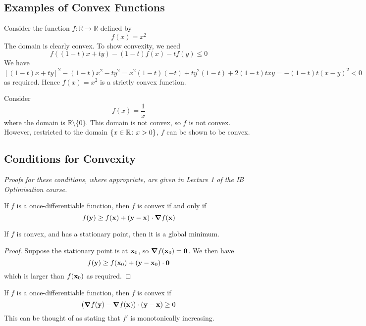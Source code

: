 \subsection{Examples of Convex Functions}
\begin{example}
    Consider the function \( f \colon \mathbb R \to \mathbb R \) defined by
\[ f(x) = x^2 \]
The domain is clearly convex. To show convexity, we need
\[ f((1-t)x+ty) - (1-t)f(x) - tf(y) \leq 0 \]
We have
\[ [(1-t)x+ty]^2 - (1-t)x^2 - ty^2 = x^2(1-t)(-t) + ty^2(1-t) + 2(1-t)txy = -(1-t)t(x-y)^2 < 0 \]
as required. Hence \( f(x) = x^2 \) is a strictly convex function.
\end{example}
\begin{example}
    Consider
    \[ f(x) = \frac{1}{x} \]
    where the domain is \( \mathbb R \setminus \{ 0 \} \).
    This domain is not convex, so \( f \) is not convex.
    However, restricted to the domain \( \qty{ x \in \mathbb R \colon x > 0 } \), \( f \) can be shown to be convex.
\end{example}

\subsection{Conditions for Convexity}
\textit{Proofs for these conditions, where appropriate, are given in Lecture 1 of the IB Optimisation course.}
\begin{theorem}
    If \( f \) is a once-differentiable function, then \( f \) is convex if and only if
    \[ f(\vb y) \geq f(\vb x) + (\vb y - \vb x) \cdot \grad{f}(\vb x) \]
\end{theorem}
\begin{corollary}
    If \( f \) is convex, and has a stationary point, then it is a global minimum.
\end{corollary}
\begin{proof}
    Suppose the stationary point is at \( \vb x_0 \), so \( \grad{f}(\vb x_0) = \vb 0 \).
    We then have
    \[ f(\vb y) \geq f(\vb x_0) + (\vb y - \vb x_0) \cdot \vb 0 \]
    which is larger than \( f(\vb x_0) \) as required.
\end{proof}

\begin{theorem}
    If \( f \) is a once-differentiable function, then \( f \) is convex if
    \[ (\grad{f(\vb y)} - \grad {f(\vb x)}) \cdot (\vb y - \vb x) \geq 0 \]
    This can be thought of as stating that \( f' \) is monotonically increasing.
\end{theorem}


